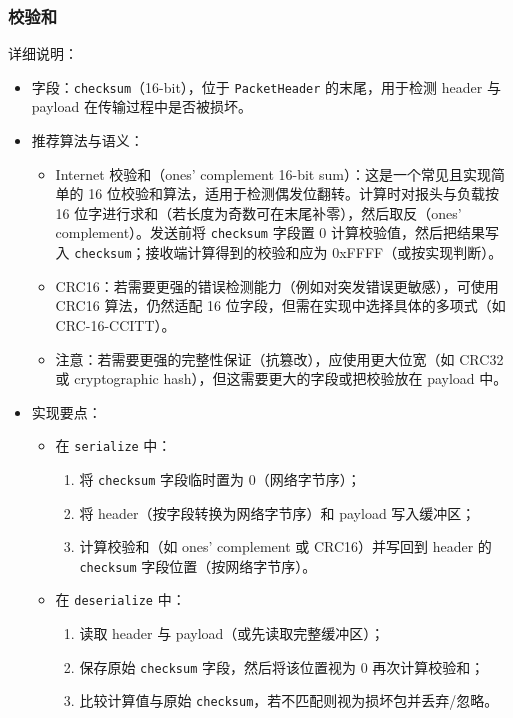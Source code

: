 \documentclass[11pt,a4paper]{article}
\begin{document}
\subsubsection{校验和}
详细说明：
\begin{itemize}
  \item 字段：\texttt{checksum}（16-bit），位于 \texttt{PacketHeader} 的末尾，用于检测 header 与 payload 在传输过程中是否被损坏。
  \item 推荐算法与语义：
    \begin{itemize}
      \item Internet 校验和（ones' complement 16-bit sum）：这是一个常见且实现简单的 16 位校验和算法，适用于检测偶发位翻转。计算时对报头与负载按 16 位字进行求和（若长度为奇数可在末尾补零），然后取反（ones' complement）。发送前将 \texttt{checksum} 字段置 0 计算校验值，然后把结果写入 \texttt{checksum}；接收端计算得到的校验和应为 0xFFFF（或按实现判断）。
      \item CRC16：若需要更强的错误检测能力（例如对突发错误更敏感），可使用 CRC16 算法，仍然适配 16 位字段，但需在实现中选择具体的多项式（如 CRC-16-CCITT）。
      \item 注意：若需要更强的完整性保证（抗篡改），应使用更大位宽（如 CRC32 或 cryptographic hash），但这需要更大的字段或把校验放在 payload 中。
    \end{itemize}
  \item 实现要点：
    \begin{itemize}
      \item 在 \texttt{serialize} 中：
        \begin{enumerate}
          \item 将 \texttt{checksum} 字段临时置为 0（网络字节序）；
          \item 将 header（按字段转换为网络字节序）和 payload 写入缓冲区；
          \item 计算校验和（如 ones' complement 或 CRC16）并写回到 header 的 \texttt{checksum} 字段位置（按网络字节序）。
        \end{enumerate}
      \item 在 \texttt{deserialize} 中：
        \begin{enumerate}
          \item 读取 header 与 payload（或先读取完整缓冲区）；
          \item 保存原始 \texttt{checksum} 字段，然后将该位置视为 0 再次计算校验和；
          \item 比较计算值与原始 \texttt{checksum}，若不匹配则视为损坏包并丢弃/忽略。
        \end{enumerate}
    \end{itemize}
\end{itemize}
\end{document}

